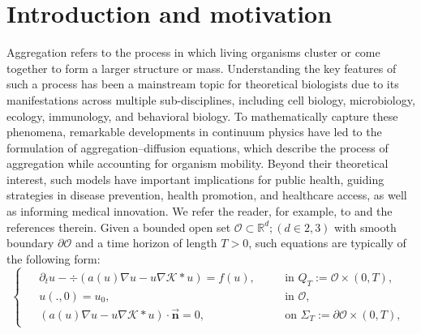 \documentclass[10pt,number,preprint,times]{elsarticle}
\numberwithin{equation}{section} %
\begin{document}
	\newpage
	\section{Introduction and motivation}\label{intro}
Aggregation refers to the process in which living organisms cluster or come together to form a larger structure or mass. Understanding the key features of such a process has been a mainstream topic for theoretical biologists due to its manifestations across multiple sub-disciplines, including cell biology, microbiology, ecology, immunology, and behavioral biology. To mathematically capture these phenomena, remarkable developments in continuum physics have led to the formulation of aggregation–diffusion equations, which describe the process of aggregation while accounting for organism mobility. Beyond their theoretical interest, such models have important implications for public health, guiding strategies in disease prevention, health promotion, and healthcare access, as well as informing medical innovation. We refer the reader, for example, to \cite{di2024kermack,mogilner1999non,bodnar2006integro,burger2008large,laurent2007local,bertozzi2009blow,carrillo2019aggregation,gomez2024beginner} and the references therein. Given a bounded open set $\mathcal{O} \subset \mathbb{R}^d; (d\in {2,3})$ with smooth boundary $\partial \mathcal{O}$ and a time horizon of length $T>0$, such equations are typically of the following form:
\begin{equation}\label{basic}
	\begin{cases}
		\begin{split}
	&\partial_t u-\div\left(a(u) \nabla u-u \nabla \mathcal{K} \ast u \right)=f(u), &&\quad \text{in } Q_T:=\mathcal{O} \times (0,T),\\
	&u(.,0)=u_0,  &&\quad \text{in } \mathcal{O},\\
	&\left(a(u)\nabla u-u \nabla \mathcal{K} \ast u\right) \cdot \overrightarrow{\textbf{n}}=0, \;\; &&\quad \text{on } \Sigma_T:=\partial \mathcal{O} \times (0,T), 
	    \end{split}
    \end{cases}
\end{equation}
\end{document}
